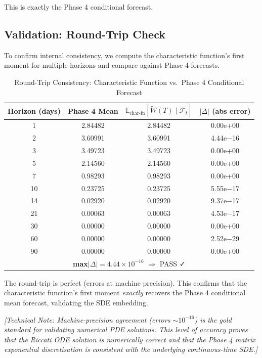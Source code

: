 \documentclass[11pt, a4paper, twoside]{article}
\begin{document}
This is exactly the Phase 4 conditional forecast.

\subsection{Validation: Round-Trip Check}

To confirm internal consistency, we compute the characteristic function's first moment for multiple horizons and compare against Phase 4 forecasts.

\begin{table}[ht]
\centering
\caption{Round-Trip Consistency: Characteristic Function vs.\ Phase 4 Conditional Forecast}
\label{tbl:roundtrip}
\small
\begin{tabularx}{0.85\textwidth}{c|c|c|c}
\toprule
\textbf{Horizon (days)} & \textbf{Phase 4 Mean} & $\mathbb{E}_{\text{char-fn}}[\tilde{W}(T) \mid \mathcal{F}_t]$ & $|\Delta|$ (abs error) \\
\midrule
1 & 2.84482 & 2.84482 & 0.00e+00 \\
2 & 3.60991 & 3.60991 & 4.44e$-$16 \\
3 & 3.49723 & 3.49723 & 0.00e+00 \\
5 & 2.14560 & 2.14560 & 0.00e+00 \\
7 & 0.98293 & 0.98293 & 0.00e+00 \\
10 & 0.23725 & 0.23725 & 5.55e$-$17 \\
14 & 0.02920 & 0.02920 & 9.37e$-$17 \\
21 & 0.00063 & 0.00063 & 4.53e$-$17 \\
30 & 0.00000 & 0.00000 & 0.00e+00 \\
60 & 0.00000 & 0.00000 & 2.52e$-$29 \\
90 & 0.00000 & 0.00000 & 0.00e+00 \\
\midrule
\multicolumn{4}{c}{\textbf{max}$|\Delta| = 4.44 \times 10^{-16}$  $\Rightarrow$  PASS ✓} \\
\bottomrule
\end{tabularx}
\end{table}

The round-trip is perfect (errors at machine precision). This confirms that the characteristic function's first moment \textit{exactly} recovers the Phase 4 conditional mean forecast, validating the SDE embedding.

\textit{[Technical Note: Machine-precision agreement (errors $\sim 10^{-16}$) is the gold standard for validating numerical PDE solutions. This level of accuracy proves that the Riccati ODE solution is numerically correct and that the Phase 4 matrix exponential discretisation is consistent with the underlying continuous-time SDE.]}
\end{document}
